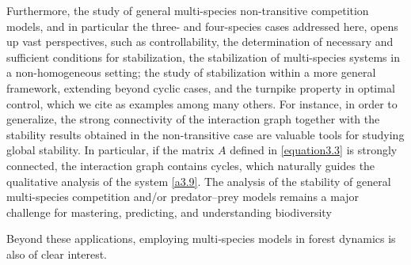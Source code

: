 \documentclass[10pt, a4paper]{amsart}
\theoremstyle{plain}
\theoremstyle{definition}
\theoremstyle{remark}
\numberwithin{equation}{section}
\begin{document}
Furthermore, the study of general multi-species non-transitive competition models, and in particular the three- and four-species cases addressed here, opens up vast perspectives, such as controllability, the determination of necessary and sufficient conditions for stabilization, the stabilization of multi-species systems in a non-homogeneous setting; the study of stabilization within a more general framework, extending beyond cyclic cases, and the turnpike property in optimal control, which we cite as examples among many others.  For instance, in order to generalize, the strong connectivity of the interaction graph together with the stability results obtained in the non-transitive case are valuable tools for studying global stability. In particular, if the matrix $A$ defined in \eqref{equation3.3} is strongly connected, the interaction graph contains cycles, which naturally guides the qualitative analysis of the system \eqref{a3.9}. The analysis of the stability of general multi-species competition and/or predator–prey models remains a major challenge for mastering, predicting, and understanding biodiversity

Beyond these applications, employing multi‐species models in forest dynamics is also of clear interest.
\appendix
\end{document}
